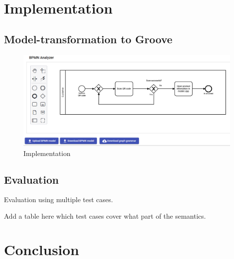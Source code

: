 \documentclass[adraft, copyright, creativecommons]{eptcs} %
\begin{document}

\section{Implementation}
\subsection{Model-transformation to Groove}

\begin{figure}[h]
    \centering
    \includegraphics[width=1\textwidth]{images/impl.png}
    \caption{Implementation}
    \label{fig:impl}
\end{figure}

\subsection{Evaluation}
Evaluation using multiple test cases.

Add a table here which test cases cover what part of the semantics.
\section{Conclusion}


\end{document}
